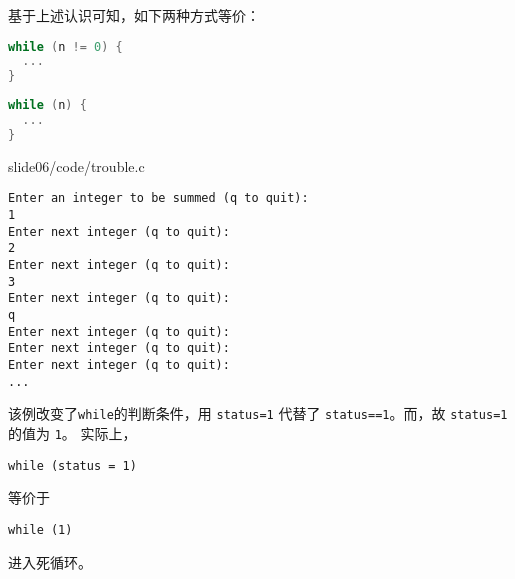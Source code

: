 \begin{frame}[fragile]

\pause

基于上述认识可知，如下两种方式等价：
\begin{minipage}{.45\textwidth}
\begin{lstlisting}[language=c,backgroundcolor=\color{red!10}]
while (n != 0) {
  ...
}
\end{lstlisting}
\end{minipage}\hfill 
\begin{minipage}{.45\textwidth}
\begin{lstlisting}[language=c,backgroundcolor=\color{red!10}]
while (n) {
  ...
}
\end{lstlisting}
\end{minipage}
\end{frame}



\begin{frame}[fragile]
  
  {slide06/code/trouble.c}
\end{frame}

\begin{frame}[fragile]
\begin{lstlisting}[backgroundcolor=\color{red!10}]
Enter an integer to be summed (q to quit): 
1
Enter next integer (q to quit): 
2
Enter next integer (q to quit): 
3
Enter next integer (q to quit): 
q
Enter next integer (q to quit): 
Enter next integer (q to quit): 
Enter next integer (q to quit):
... 
\end{lstlisting}
\end{frame}

\begin{frame}[fragile]
  该例改变了\lstinline|while|的判断条件，用 \lstinline|status=1| 代替了 \lstinline|status==1|。而，故 \lstinline|status=1| 的值为 \lstinline|1|。
实际上，
\begin{lstlisting}
while (status = 1) 
\end{lstlisting}
等价于
\begin{lstlisting}
while (1) 
\end{lstlisting}
进入死循环。
\end{frame}

